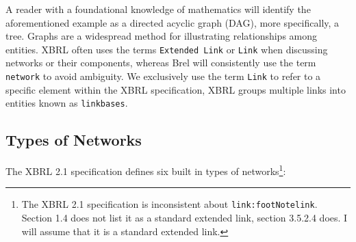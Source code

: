 
A reader with a foundational knowledge of mathematics will identify the aforementioned example as a directed acyclic graph (DAG), 
more specifically, a tree.
Graphs are a widespread method for illustrating relationships among entities.
XBRL often uses the terms \texttt{Extended Link} or \texttt{Link} when discussing networks or their components,
whereas Brel will consistently use the term \texttt{network} to avoid ambiguity.
We exclusively use the term \texttt{Link} to refer to a specific element within the XBRL specification,
XBRL groups multiple links into entities known as \texttt{linkbases}.

\subsection{Types of Networks}

The XBRL 2.1 specification defines six built in types of networks\cite{xbrl21_terminology}\footnote{The XBRL 2.1 specification is inconsistent about \texttt{link:footNotelink}. Section 1.4 does not list it as a standard extended link, section 3.5.2.4 does. I will assume that it is a standard extended link.}:

